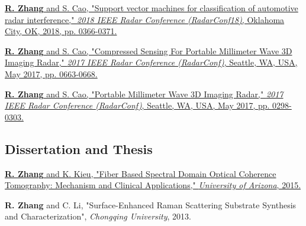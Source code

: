 \documentclass[letterpaper,9pt]{article}
\renewenvironment{itemize}{
  \begin{list}{}{
    \setlength{\topsep}{0pt}
    \setlength{\itemsep}{0pt}
    \setlength{\parsep}{0pt}
    \setlength{\partopsep}{0pt}
    \setlength{\leftmargin}{1.5em}
  }
}{\end{list}}
\begin{document}
\begin{itemize}
  \item \href{https://ieeexplore.ieee.org/abstract/document/8378586/}{{\bf R. Zhang} and S. Cao, "Support vector machines for classification of automotive radar interference," {\it 2018 IEEE Radar Conference (RadarConf18)}, Oklahoma City, OK, 2018, pp. 0366-0371.}
  \item \href{http://ieeexplore.ieee.org/document/7944286/}{{\bf R. Zhang} and S. Cao, "Compressed Sensing For Portable Millimeter Wave 3D Imaging Radar," {\it 2017 IEEE Radar Conference (RadarConf)}, Seattle, WA, USA, May 2017, pp. 0663-0668.}
  \item \href{http://ieeexplore.ieee.org/abstract/document/7944216/}{{\bf R. Zhang} and S. Cao, "Portable Millimeter Wave 3D Imaging Radar," {\it 2017 IEEE Radar Conference (RadarConf)}, Seattle, WA, USA, May 2017, pp. 0298-0303.}
\end{itemize}

\subsection*{Dissertation and Thesis}

\begin{itemize}
  \item \href{https://scholar.google.com/citations?view_op=view_citation&hl=en&user=PpPf3BoAAAAJ&citation_for_view=PpPf3BoAAAAJ:9yKSN-GCB0IC}{{\bf R. Zhang} and K. Kieu, "Fiber Based Spectral Domain Optical Coherence Tomography: Mechanism and Clinical Applications," {\it University of Arizona}, 2015.}

  \item {\bf R. Zhang} and C. Li, "Surface-Enhanced Raman Scattering Substrate Synthesis and Characterization", {\it Chongqing University}, 2013.
\end{itemize}
\end{document}
